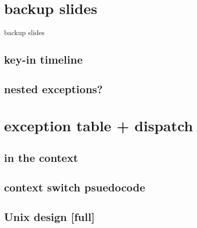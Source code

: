 \date{}
\title{}
\date{}

\begin{frame}
    \titlepage
\end{frame}





\section{backup slides}
\begin{frame}{backup slides}
\end{frame}

\subsection{key-in timeline}


\subsection{nested exceptions?}


\section{exception table + dispatch}


\subsection{in the context}


\subsection{context switch psuedocode}


\subsection{Unix design [full]}




